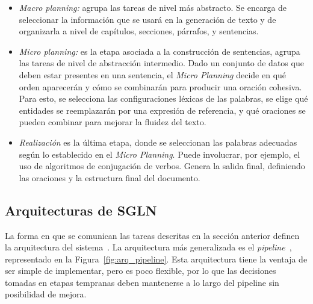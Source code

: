 \begin{itemize}
    \item  \emph{Macro planning:} agrupa las tareas de nivel más abstracto. Se encarga de seleccionar la información que se usará en la generación de texto y de organizarla a nivel de capítulos, secciones, párrafos, y sentencias.
    \item \emph{Micro planning:} es la etapa asociada a la construcción de sentencias, agrupa las tareas de nivel de abstracción intermedio. Dado un conjunto de datos que deben estar presentes en una sentencia, el \emph{Micro Planning} decide en qué orden aparecerán y cómo se combinarán para producir una oración cohesiva. 
    Para esto, se selecciona las configuraciones léxicas de las palabras, se elige qué entidades se reemplazarán por una expresión de referencia, y qué oraciones se pueden combinar para mejorar la fluidez del texto.
    \item \emph{Realización} es la última etapa, donde se seleccionan las palabras adecuadas según lo establecido en el \emph{Micro Planning}. Puede involucrar, por ejemplo, el uso de algoritmos de conjugación de verbos. 
    Genera la salida final, definiendo las oraciones y la estructura final del documento.
\end{itemize}

\subsection{Arquitecturas de SGLN}
La forma en que se comunican las tareas descritas en la sección anterior definen la arquitectura del sistema~\cite{ibanez2004arquitectura}. La arquitectura más generalizada es el \emph{pipeline}~\cite{hervas2008descripcion}, representado en la Figura~\ref{fig:arq_pipeline}.
Esta arquitectura tiene la ventaja de ser simple de implementar, pero es poco flexible, por lo que las decisiones tomadas en etapas tempranas deben mantenerse a lo largo del pipeline sin posibilidad de mejora.

